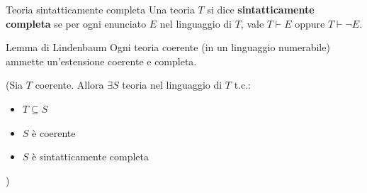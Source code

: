 \documentclass[a4paper,11pt]{report}
\begin{document}
\begin{defframe}{Teoria sintatticamente completa}{}
        Una teoria \( T \) si dice \textbf{sintatticamente completa} se per ogni enunciato \( E \) nel linguaggio di \( T \), vale \( T \vdash E \) oppure \( T \vdash \neg E \).
\end{defframe}

\begin{lemmaframe}{Lemma di  Lindenbaum}{}
    Ogni teoria coerente (in un linguaggio numerabile) ammette un'estensione coerente e completa.

    (Sia \( T \) coerente. Allora \( \exists S\) teoria nel linguaggio di \( T \) t.c.:
\begin{itemize}
    \item \( T \subseteq S \)
    \item \(S  \) è coerente
    \item \( S \) è sintatticamente completa
\end{itemize}
    )
\end{lemmaframe}
\end{document}
